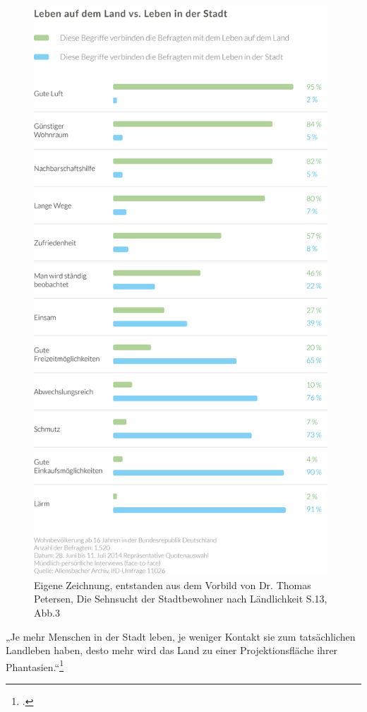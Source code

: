 \documentclass{scrartcl}
\begin{document}
\begin{figure}[htbp]
\centering
\includegraphics[width=11cm]{image_folder/SchaubildStadtVsLand_Umfrage.png}
\caption{Eigene Zeichnung, entstanden aus dem Vorbild von Dr. Thomas Petersen, Die Sehnsucht der Stadtbewohner nach Ländlichkeit S.13, Abb.3}
\label{fig:SchaubildStadtVsLandUmfrage}
\end{figure}

\begin{displayquote}
„Je mehr Menschen in der Stadt leben, je weniger Kontakt sie zum tatsächlichen Landleben haben, desto mehr wird das Land zu einer Projektionsfläche ihrer Phantasien.“\footcite[S. 8]{Dr.ThomasPetersen2014DieLandlichkeit}
\end{displayquote}
\end{document}

